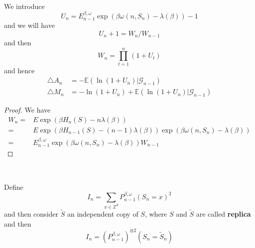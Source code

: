 \begin{definition}
    \ \par
    We introduce
    \[
    U_n = E^{\beta,\omega}_{n-1}\exp(\beta\omega(n,S_n)-\lambda(\beta))-1
    \]
    and we will have
    \[
    U_n + 1 = W_n/W_{n-1}
    \]
    and then
    \[
    W_n = \prod_{t=1}^n(1+U_t)
    \]
    and hence
    \[
    \begin{aligned}
    \triangle A_n &= - \mathbb{E}(\ln(1+U_n)|\mathcal{G}_{n-1}) \\
    \triangle M_n &= -\ln(1+U_n) + \mathbb{E}(\ln(1+U_n)|\mathcal{G}_{n-1})
    \end{aligned}
    \]
\end{definition}
\begin{proof}
    We have
    \[
    \begin{aligned}
        W_n =& E\exp(\beta H_n(S) - n\lambda(\beta)) \\ =& E\exp(\beta H_{n-1}(S) - (n-1)\lambda(\beta))\exp(\beta\omega(n,S_n) - \lambda(\beta)) \\
        =& E_{n-1}^{\beta,\omega}\exp(\beta\omega(n,S_n)-\lambda(\beta))W_{n-1}
    \end{aligned}
    \]
\end{proof}

\begin{definition}\ \par
    Define
    \[I_n = \sum\limits_{x\in\mathbb{Z}^d} P_{n-1}^{\beta,\omega}(S_n = x)^2\]
    and then consider $\tilde{S}$ an independent copy of $S$, where $S$ and $\tilde{S}$ are called \textbf{replica} and then
    \[
    I_n = (P_{n-1}^{\beta,\omega})^{\otimes 2}(S_n = \tilde{S}_n)
    \]
\end{definition}

